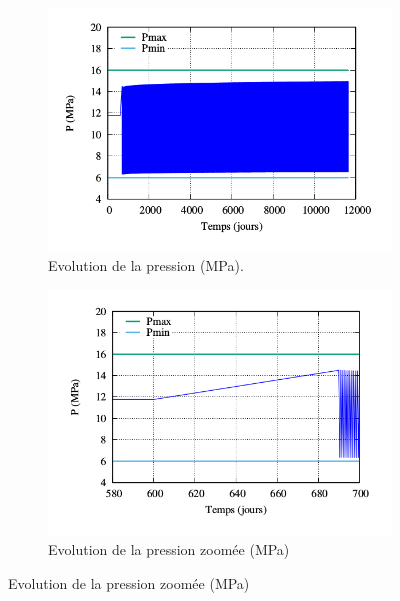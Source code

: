 \documentclass[11pt,french,a4paper]{article}
\begin{document}
  \begin{figure}[h!]
    \centering
    
    \begin{subfigure}[b]{0.4\linewidth}
        \includegraphics[width=\linewidth]{image/annexe/cav_sal/P2M_bon/P.png}
        \caption{Evolution de la pression (MPa).}
    \end{subfigure}
    \hspace{1cm}
    \begin{subfigure}[b]{0.4\linewidth}
        \includegraphics[width=\linewidth]{image/annexe/cav_sal/P2M_bon/P_zoom.png}
        \caption{Evolution de la pression zoomée (MPa)}
    \end{subfigure}
    

\end{figure}
\end{document}
